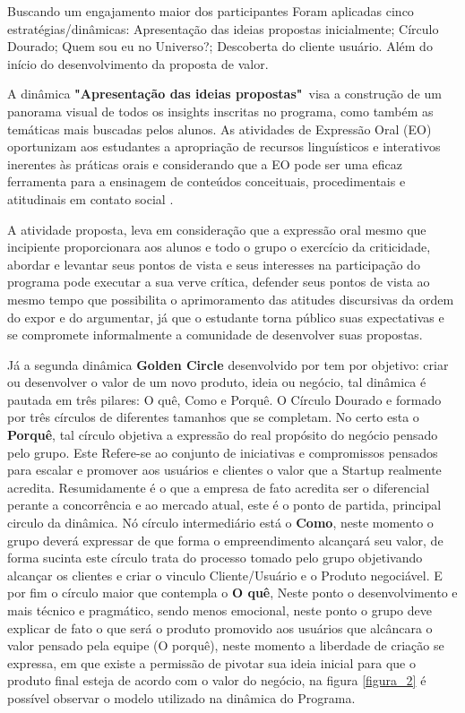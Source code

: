 Buscando um engajamento maior dos participantes Foram
aplicadas cinco estratégias/dinâmicas: Apresentação das ideias propostas inicialmente; Círculo Dourado;
Quem sou eu no Universo?; Descoberta do cliente usuário. Além do
início do desenvolvimento da proposta de valor.

A dinâmica \textbf{"Apresentação das ideias propostas"}\ visa a construção de um panorama visual de todos os insights inscritas no programa, como também as temáticas mais buscadas pelos alunos. As atividades de Expressão Oral (EO) oportunizam aos estudantes a apropriação de recursos linguísticos e interativos inerentes às práticas orais e considerando que a EO pode ser uma eficaz ferramenta para a ensinagem de conteúdos conceituais, procedimentais e atitudinais em contato social \cite{baltar_genero_2010}.

A atividade proposta, leva em consideração que a expressão oral mesmo que incipiente proporcionara aos alunos e todo o grupo o exercício da criticidade, abordar e levantar seus pontos de vista e seus interesses na participação do programa pode executar a sua verve crítica, defender seus pontos de vista ao mesmo tempo que possibilita o aprimoramento das atitudes discursivas da ordem do expor e do argumentar, já que o estudante torna público suas expectativas e se compromete informalmente a comunidade de desenvolver suas propostas. 

Já a segunda dinâmica \textbf{Golden Circle} desenvolvido por  tem por objetivo: criar ou desenvolver o valor de um novo produto, ideia ou negócio, tal dinâmica é pautada em três pilares: O quê, Como e Porquê. O Círculo Dourado e formado por três círculos de diferentes tamanhos que se completam. No certo esta o \textbf{Porquê}, tal círculo objetiva a expressão do real propósito do negócio pensado pelo grupo. Este Refere-se ao conjunto de iniciativas e compromissos pensados para escalar e promover aos usuários e clientes o valor que a Startup realmente acredita. Resumidamente é o que a empresa de fato acredita ser o  diferencial perante a concorrência e ao mercado atual, este é o ponto de partida, principal circulo da dinâmica. 
Nó círculo intermediário está o \textbf{Como}, neste momento o grupo deverá expressar de que forma o empreendimento alcançará seu valor, de forma sucinta este círculo trata do processo tomado pelo grupo objetivando alcançar os clientes e criar o vinculo Cliente/Usuário e o Produto negociável. 
E por fim o círculo maior que contempla o \textbf{O quê}, Neste ponto o desenvolvimento e mais técnico e pragmático, sendo menos emocional, neste ponto o grupo deve explicar de fato o que será o produto promovido aos usuários que alcâncara o valor pensado pela equipe (O porquê), neste momento a liberdade de criação se expressa, em que existe a permissão de pivotar sua ideia inicial para que o produto final esteja de acordo com o valor do negócio, na figura \ref{figura_2} é possível observar o modelo utilizado na dinâmica do Programa.


